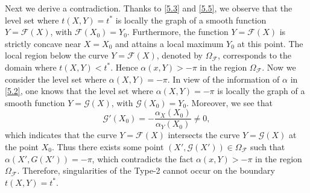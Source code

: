 \documentclass[11pt,reqno]{article}
\newcommand{\fr}{\frac}
\numberwithin{equation}{section}
\begin{document}

Next we derive a contradiction. Thanks to \eqref{5.3} and \eqref{5.5}, we observe that the level set where $t(X,Y)=t^*$ is locally the graph of a smooth function $Y=\mathcal{F}(X)$, with $\mathcal{F}(X_0)=Y_0$. Furthermore, the function $Y=\mathcal{F}(X)$ is strictly concave near $X=X_0$ and attains a local maximum $Y_0$ at this point.
The local region below the curve $Y=\mathcal{F}(X)$, denoted by $\Omega_\mathcal{F}$, corresponds to the domain where \(t(X,Y)<t^{*}\). Hence $\alpha(x, Y)>-\pi$ in the region $\Omega_\mathcal{F}$.
Now we consider the level set where $\alpha(X,Y)=-\pi$. In view of the information of $\alpha$ in \eqref{5.2}, one knows that the level set where $\alpha(X,Y)=-\pi$ is locally the graph of a smooth function $Y=\mathcal{G}(X)$, with $\mathcal{G}(X_0)=Y_0$. Moreover, we see that
$$
\mathcal{G}'(X_0)=-\fr{\alpha_X(X_0)}{\alpha_Y(X_0)}\neq0,
$$
which indicates that the curve $Y=\mathcal{F}(X)$ intersects the curve $Y=\mathcal{G}(X)$ at the point $X_0$. Thus there exists some point $(X', \mathcal{G}(X'))\in \Omega_\mathcal{F}$ such that $\alpha(X', G(X'))=-\pi$, which contradicts the fact $\alpha(x, Y)>-\pi$ in the region $\Omega_\mathcal{F}$. Therefore, singularities of the Type-2 cannot occur on the boundary $t(X,Y)=t^*$.
\end{document}
